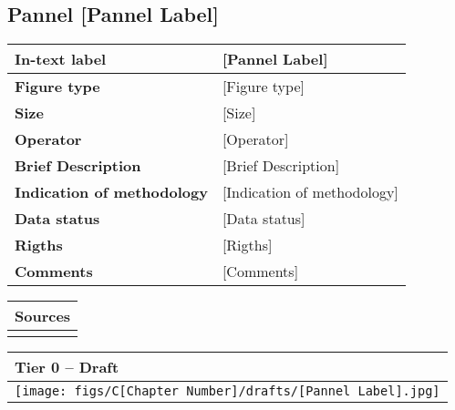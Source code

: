 \clearpage

\subsection{Pannel [Pannel Label]} \label{subsec_[Pannel Label]}

\small

\begin{table}[h!] %
\centering
\small %
\sffamily %
\begin{tabular}{| m{6cm} | m{8cm} |}
    \hline
    \textbf{In-text label} & [Pannel Label] \\
    \hline
    \textbf{Figure type} & [Figure type] \\
    \hline
    \textbf{Size} & [Size] \\
    \hline
    \textbf{Operator} & [Operator] \\
    \hline
    \textbf{Brief Description} & [Brief Description] \\
    \hline
    \textbf{Indication of methodology} & [Indication of methodology] \\
    \hline
    \textbf{Data status} & [Data status] \\
    \hline
    \textbf{Rigths} & [Rigths] \\
    \hline
    \textbf{Comments} & [Comments]\\
    \hline
    \end{tabular}
\end{table}

\begin{table}[h!] %
\centering
\small %
\sffamily %
\begin{tabular}{| m{14.5cm} |}
    \hline
    \textbf{Sources} \\
    \hline
    [Sources] \\
    \hline
    \end{tabular}
\end{table}

\begin{table}[h!] %
\centering
\small %
\sffamily %
\begin{tabular}{| m{14.5cm} |}
    \hline
    \textbf{Tier 0 -- Draft} \\
    \hline
    \hspace{5pt} \texttt{[image: figs/C[Chapter Number]/drafts/[Pannel Label].jpg]} \\
    \hline
    \end{tabular}
\end{table}